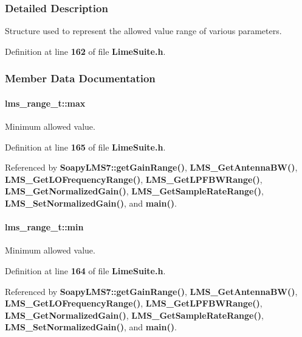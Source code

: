 \subsubsection{Detailed Description}
Structure used to represent the allowed value range of various parameters. 

Definition at line {\bf 162} of file {\bf Lime\+Suite.\+h}.



\subsubsection{Member Data Documentation}
\paragraph[{max}]{ lms\+\_\+range\+\_\+t\+::max}\label{structlms__range__t_aef8d64f19e45d7a03fdc4e73a536c3ef}


Minimum allowed value. 



Definition at line {\bf 165} of file {\bf Lime\+Suite.\+h}.



Referenced by {\bf Soapy\+L\+M\+S7\+::get\+Gain\+Range()}, {\bf L\+M\+S\+\_\+\+Get\+Antenna\+B\+W()}, {\bf L\+M\+S\+\_\+\+Get\+L\+O\+Frequency\+Range()}, {\bf L\+M\+S\+\_\+\+Get\+L\+P\+F\+B\+W\+Range()}, {\bf L\+M\+S\+\_\+\+Get\+Normalized\+Gain()}, {\bf L\+M\+S\+\_\+\+Get\+Sample\+Rate\+Range()}, {\bf L\+M\+S\+\_\+\+Set\+Normalized\+Gain()}, and {\bf main()}.

\paragraph[{min}]{ lms\+\_\+range\+\_\+t\+::min}\label{structlms__range__t_a37284d4cd9791ea7d3126793b600be2b}


Minimum allowed value. 



Definition at line {\bf 164} of file {\bf Lime\+Suite.\+h}.



Referenced by {\bf Soapy\+L\+M\+S7\+::get\+Gain\+Range()}, {\bf L\+M\+S\+\_\+\+Get\+Antenna\+B\+W()}, {\bf L\+M\+S\+\_\+\+Get\+L\+O\+Frequency\+Range()}, {\bf L\+M\+S\+\_\+\+Get\+L\+P\+F\+B\+W\+Range()}, {\bf L\+M\+S\+\_\+\+Get\+Normalized\+Gain()}, {\bf L\+M\+S\+\_\+\+Get\+Sample\+Rate\+Range()}, {\bf L\+M\+S\+\_\+\+Set\+Normalized\+Gain()}, and {\bf main()}.

